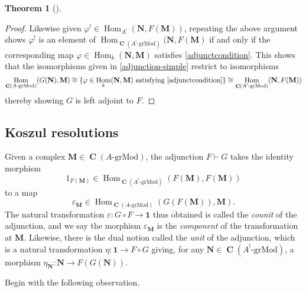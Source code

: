 \documentclass[a4paper]{article}
\theoremstyle{definition}
\newtheorem{theorem}[defn]{Theorem}
\theoremstyle{remark}
\newcommand{\grMod}{\ensuremath{\text{-grMod}}}
\DeclareMathOperator{\Hom}{\text{Hom}}
\DeclareMathOperator{\Ch}{\mathbf{C}}
\begin{document}
\begin{theorem}[]
\begin{proof}
        Likewise given \(\varphi^!\in \Hom_{A^!}(\mathbf{N},F(\mathbf{M}))\),
        repeating the above argument shows \(\varphi^!\) is an element of
        \(\Hom_{\Ch(A^!\grMod)}(\mathbf{N},F(\mathbf{M})\) if and only if
        the corresponding map \(\varphi \in \Hom_k(\mathbf{N},\mathbf{M})\)
        satisfies \eqref{adjunctcondition}. This shows that the isomorphisms
        given in \cref{adjunction-simple} restrict to isomorphisms
        \[\Hom_{\Ch(A\grMod)}(G(\mathbf{N}),\mathbf{M})\cong \{\varphi\in \Hom_k(\mathbf{N},\mathbf{M}) \text{ satisfying \eqref{adjunctcondition}}\} \cong \Hom_{\Ch(A^!\grMod)}(\mathbf{N},F(\mathbf{M})) \]
        thereby showing \(G\) is left adjoint to \(F\).
    \end{proof}
\end{theorem}

\subsection{Koszul resolutions}

Given a complex \(\mathbf{M}\in \Ch(A\grMod)\), the adjunction \(F\vdash G\)
takes the identity morphism
\[1_{F(\mathbf{M})}\in \Hom_{\Ch(A^!\grMod)}(F(\mathbf{M}), F(\mathbf{M}))\]
to a map 
\[\varepsilon_{\mathbf{M}}\in \Hom_{\Ch(A\grMod)}(G(F(\mathbf{M})), \mathbf{M}).\]
The natural transformation \(\varepsilon:G\circ F\rightarrow \mathbf{1}\) thus
obtained is called the \textit{counit} of the adjunction, and we say the
morphism \(\varepsilon_{\mathbf{M}}\) is the \textit{component} of the
transformation at \(\mathbf{M}\). Likewise, there is the dual notion called the
\textit{unit} of the adjunction, which is a natural transformation \(\eta:
\mathbf{1}\rightarrow F\circ G\) giving, for any \(\mathbf{N}\in
\Ch(A^!\grMod)\), a morphism \(\eta_\mathbf{N}:\mathbf{N}\rightarrow
F(G(\mathbf{N})).\) 

Begin with the following observation.
\end{document}
